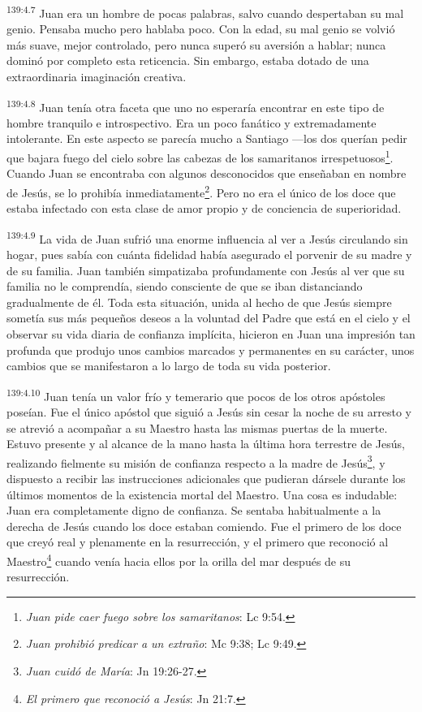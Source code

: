 \par 
\textsuperscript{139:4.7} Juan era un hombre de pocas palabras, salvo cuando despertaban su mal genio. Pensaba mucho pero hablaba poco. Con la edad, su mal genio se volvió más suave, mejor controlado, pero nunca superó su aversión a hablar; nunca dominó por completo esta reticencia. Sin embargo, estaba dotado de una extraordinaria imaginación creativa.

\par 
\textsuperscript{139:4.8} Juan tenía otra faceta que uno no esperaría encontrar en este tipo de hombre tranquilo e introspectivo. Era un poco fanático y extremadamente intolerante. En este aspecto se parecía mucho a Santiago ---los dos querían pedir que bajara fuego del cielo sobre las cabezas de los samaritanos irrespetuosos\footnote{\textit{Juan pide caer fuego sobre los samaritanos}: Lc 9:54.}. Cuando Juan se encontraba con algunos desconocidos que enseñaban en nombre de Jesús, se lo prohibía inmediatamente\footnote{\textit{Juan prohibió predicar a un extraño}: Mc 9:38; Lc 9:49.}. Pero no era el único de los doce que estaba infectado con esta clase de amor propio y de conciencia de superioridad.

\par 
\textsuperscript{139:4.9} La vida de Juan sufrió una enorme influencia al ver a Jesús circulando sin hogar, pues sabía con cuánta fidelidad había asegurado el porvenir de su madre y de su familia. Juan también simpatizaba profundamente con Jesús al ver que su familia no le comprendía, siendo consciente de que se iban distanciando gradualmente de él. Toda esta situación, unida al hecho de que Jesús siempre sometía sus más pequeños deseos a la voluntad del Padre que está en el cielo y el observar su vida diaria de confianza implícita, hicieron en Juan una impresión tan profunda que produjo unos cambios marcados y permanentes en su carácter, unos cambios que se manifestaron a lo largo de toda su vida posterior.

\par 
\textsuperscript{139:4.10} Juan tenía un valor frío y temerario que pocos de los otros apóstoles poseían. Fue el único apóstol que siguió a Jesús sin cesar la noche de su arresto y se atrevió a acompañar a su Maestro hasta las mismas puertas de la muerte. Estuvo presente y al alcance de la mano hasta la última hora terrestre de Jesús, realizando fielmente su misión de confianza respecto a la madre de Jesús\footnote{\textit{Juan cuidó de María}: Jn 19:26-27.}, y dispuesto a recibir las instrucciones adicionales que pudieran dársele durante los últimos momentos de la existencia mortal del Maestro. Una cosa es indudable: Juan era completamente digno de confianza. Se sentaba habitualmente a la derecha de Jesús cuando los doce estaban comiendo. Fue el primero de los doce que creyó real y plenamente en la resurrección, y el primero que reconoció al Maestro\footnote{\textit{El primero que reconoció a Jesús}: Jn 21:7.} cuando venía hacia ellos por la orilla del mar después de su resurrección.

